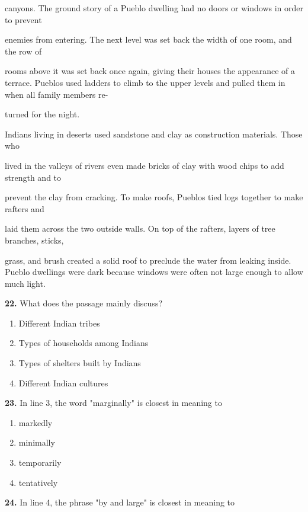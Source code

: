 \documentclass[12pt]{article}
\begin{document}
canyons. The ground story of a Pueblo dwelling had no doors or windows in order to prevent\par
enemies from entering. The next level was set back the width of one room, and the row of\par
rooms above it was set back once again, giving their houses the appearance of a terrace. Pueblos used ladders to climb to the upper levels and pulled them in when all family members re-\par
turned for the night.\par
Indians living in deserts used sandstone and clay as construction materials. Those who\par
lived in the valleys of rivers even made bricks of clay with wood chips to add strength and to\par
prevent the clay from cracking. To make roofs, Pueblos tied logs together to make rafters and\par
laid them across the two outside walls. On top of the rafters, layers of tree branches, sticks,\par
grass, and brush created a solid roof to preclude the water from leaking inside. Pueblo dwellings were dark because windows were often not large enough to allow much light.\par
\endgroup
\medskip
\noindent\textbf{22.} What does the passage mainly discuss?
\begin{enumerate}[label=(\Alph*),leftmargin=*,itemsep=0.2em]
\item Different Indian tribes
\item Types of households among Indians
\item Types of shelters built by Indians
\item Different Indian cultures
\end{enumerate}
\par
\vspace{0.25\baselineskip}
\noindent\textbf{23.} In line 3, the word "marginally" is closest in meaning to
\begin{enumerate}[label=(\Alph*),leftmargin=*,itemsep=0.2em]
\item markedly
\item minimally
\item temporarily
\item tentatively
\end{enumerate}
\par
\vspace{0.25\baselineskip}
\noindent\textbf{24.} In line 4, the phrase "by and large" is closest in meaning to
\end{document}
